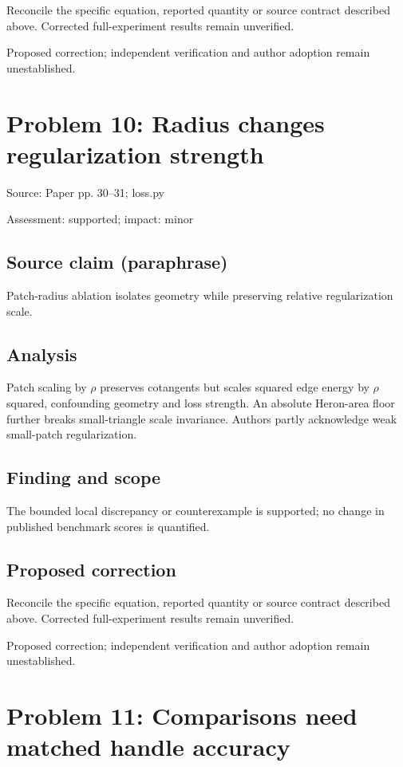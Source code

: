 \documentclass[11pt]{article}
\begin{document}
Reconcile the specific equation, reported quantity or source contract described above. Corrected full-experiment results remain unverified.

Proposed correction; independent verification and author adoption remain unestablished.

\section*{Problem 10: Radius changes regularization strength}

Source: Paper pp. 30–31; loss.py

Assessment: supported; impact: minor

\subsection*{Source claim (paraphrase)}

Patch-radius ablation isolates geometry while preserving relative regularization scale.

\subsection*{Analysis}

Patch scaling by \(\rho\) preserves cotangents but scales squared edge energy by \(\rho\) squared, confounding geometry and loss strength. An absolute Heron-area floor further breaks small-triangle scale invariance. Authors partly acknowledge weak small-patch regularization.

\subsection*{Finding and scope}

The bounded local discrepancy or counterexample is supported; no change in published benchmark scores is quantified.

\subsection*{Proposed correction}

Reconcile the specific equation, reported quantity or source contract described above. Corrected full-experiment results remain unverified.

Proposed correction; independent verification and author adoption remain unestablished.

\section*{Problem 11: Comparisons need matched handle accuracy}
\end{document}
